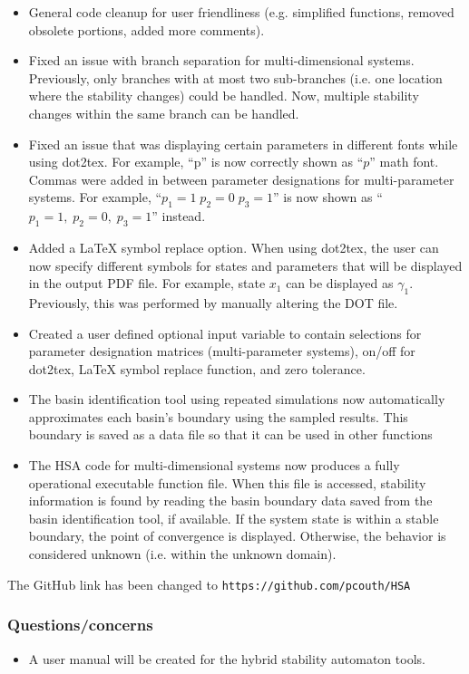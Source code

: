 \documentclass[12pt]{article}
\begin{document}
\begin{itemize}
\item General code cleanup for user friendliness (e.g. simplified functions, removed obsolete portions, added more comments).

\item Fixed an issue with branch separation for multi-dimensional systems. Previously, only branches with at most two sub-branches (i.e. one location where the stability changes) could be handled. Now, multiple stability changes within the same branch can be handled.

\item Fixed an issue that was displaying certain parameters in different fonts while using dot2tex. For example, ``p'' is now correctly shown as ``$p$'' math font. Commas were added in between parameter designations for multi-parameter systems. For example, ``$p_1=1 \; p_2=0 \; p_3=1$'' is now shown as ``$p_1=1, \; p_2=0, \; p_3=1$'' instead.

\item Added a LaTeX symbol replace option. When using dot2tex, the user can now specify different symbols for states and parameters that will be displayed in the output PDF file. For example, state $x_1$ can be displayed as $\gamma_1$. Previously, this was performed by manually altering the DOT file.

\item Created a user defined optional input variable to contain selections for parameter designation matrices (multi-parameter systems), on/off for dot2tex, LaTeX symbol replace function, and zero tolerance.

\item The basin identification tool using repeated simulations now automatically approximates each basin's boundary using the sampled results. This boundary is saved as a data file so that it can be used in other functions

\item The HSA code for multi-dimensional systems now produces a fully operational executable function file. When this file is accessed, stability information is found by reading the basin boundary data saved from the basin identification tool, if available. If the system state is within a stable boundary, the point of convergence is displayed. Otherwise, the behavior is considered unknown (i.e. within the unknown domain).

\end{itemize}

\noindent The GitHub link has been changed to \texttt{https://github.com/pcouth/HSA}

\subsubsection{Questions/concerns}
\begin{itemize}
\item A user manual will be created for the hybrid stability automaton tools.
\end{itemize}




\end{document}
